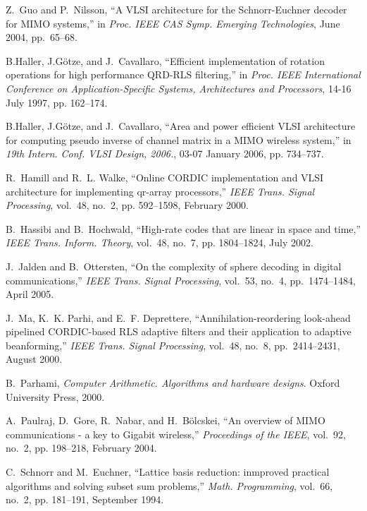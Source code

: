 \documentclass[12pt,onecolumn,draftclsnofoot]{IEEEtran}
\begin{document}
\begin{thebibliography}{10}
Z.~Guo and P.~Nilsson, ``A {VLSI} architecture for the
{S}chnorr-{E}uchner decoder for {MIMO} systems,'' in \emph{Proc.
{IEEE CAS} {S}ymp. {E}merging {T}echnologies}, June 2004,
pp.~65--68.

B.Haller, J.G{\"o}tze, and J.~Cavallaro, ``Efficient implementation
of rotation  operations for high performance {QRD-RLS} filtering,''
in \emph{Proc. IEEE   International Conference on
Application-Specific Systems, Architectures and   Processors}, 14-16
July 1997, pp. 162--174.

B.Haller, J.G{\"o}tze, and J.~Cavallaro, ``Area and power efficient
{VLSI}  architecture for computing pseudo inverse of channel matrix
in a MIMO  wireless system,'' in \emph{19th Intern. Conf. VLSI
Design, 2006.}, 03-07 January 2006, pp. 734--737.

R.~Hamill and R.~L. Walke, ``Online {CORDIC} implementation and
{VLSI} architecture for implementing qr-array processors,''
\emph{{IEEE} Trans. Signal Processing}, vol.~48, no.~2, pp.
592--1598, February 2000.

B.~Hassibi and B.~Hochwald, ``High-rate codes that are linear in
space and time,'' \emph{{IEEE} Trans. Inform. Theory}, vol.~48,
no.~7, pp. 1804--1824, July 2002.

J.~Jalden and B.~Ottersten, ``On the complexity of sphere decoding
in digital  communications,'' \emph{{IEEE} Trans. Signal
Processing}, vol.~53, no.~4, pp.~1474--1484, April 2005.

J.~Ma, K.~K. Parhi, and E.~F. Deprettere, ``Annihilation-reordering
look-ahead pipelined {CORDIC}-based {RLS} adaptive filters and their
application to   adaptive beanforming,'' \emph{{IEEE} Trans. Signal
Processing}, vol.~48,  no.~8, pp.~2414--2431, August 2000.

B.~Parhami, \emph{Computer Arithmetic. Algorithms and hardware
designs}. Oxford University Press, 2000.

A.~Paulraj, D.~Gore, R.~Nabar, and H.~B{\"o}lcskei, ``An overview of
{MIMO} communications - a key to {G}igabit wireless,''
\emph{Proceedings of the IEEE}, vol.~92, no.~2, pp. 198--218,
February 2004.

C.~Schnorr and M.~Euchner, ``Lattice basis reduction: inmproved
practical  algorithms and solving subset sum problems,'' \emph{Math.
Programming}, vol.~66, no.~2, pp. 181--191, September 1994.


\end{thebibliography}
\end{document}
